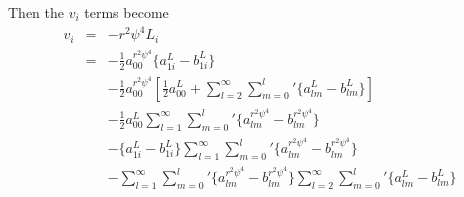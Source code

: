 \documentclass[11pt]{article}
\begin{document}
\noindent
Then the $v_i$ terms become
\begin{eqnarray}
v_i &=& -r^2 \psi^4 L_i \\ \nonumber
&=& -\frac{1}{2} a_{00}^{r^2 \psi^4} \{ a_{1i}^{L}-b_{1i}^{L} \} \\ \nonumber
&&-\frac{1}{2}a_{00}^{r^2\psi^4} \left[ \frac{1}{2}a_{00}^{L}+\sum_{l=2}^{\infty}{\sum_{m=0}^l}' \{ a_{lm}^{L}-b_{lm}^{L}\} \right] \\
&&-\frac{1}{2}a_{00}^{L}\sum_{l=1}^{\infty}{\sum_{m=0}^l}' \{ a_{lm}^{r^2 \psi^4}-b_{lm}^{r^2 \psi^4}\} \\ \nonumber
&& -\{ a_{1i}^{L}-b_{1i}^{L} \} \sum_{l=1}^{\infty}{\sum_{m=0}^l}' \{ a_{lm}^{r^2 \psi^4}-b_{lm}^{r^2 \psi^4}\} \\ \nonumber
&& -\sum_{l=1}^{\infty}{\sum_{m=0}^l}' \{ a_{lm}^{r^2 \psi^4}-b_{lm}^{r^2 \psi^4}\} 
        \sum_{l=2}^{\infty}{\sum_{m=0}^l}' \{ a_{lm}^{L}-b_{lm}^{L}\}
\end{eqnarray}




















%
%
\end{document}
